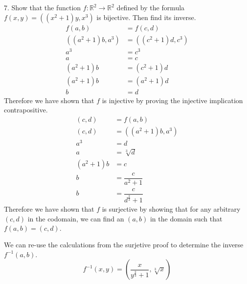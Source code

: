 \documentclass{hippoidC}
\begin{document}
\begin{prooflist}{7. Show that the function $f: \mathbb{R}^2 \rightarrow
			\mathbb{R}^2$ defined by the formula $f(x, y)=\left(\left(x^2+1\right) y,
			x^3\right)$ is bijective. Then find its inverse.}
	\inj{}
	\begin{align*}
		f(a, b)                               & =f(c, d)                                \\
		\left(\left(a^2+1\right)b, a^3\right) & = \left(\left(c^2+1\right)d, c^3\right) \\
		a^3                                   & =c^3                                    \\
		a                                     & =c                                      \\
		(a^2+1)b                              & = (c^2+1)d                              \\
		(a^2+1)b                              & = (a^2+1)d                              \\
		b                                     & = d
	\end{align*}
	Therefore we have shown that $f$ is injective by proving the injective
	implication contrapositive.
	\surj{}
	\begin{align*}
		(c, d)   & = f(a, b)                               \\
		(c, d)   & = \left(\left(a^2+1\right)b, a^3\right) \\
		a^3      & =d                                      \\
		a        & =\sqrt[3]{d}                            \\
		(a^2+1)b & =c                                      \\
		b        & =\dfrac{c}{a^2+1}                       \\
		b        & =\dfrac{c}{d^{\frac{2}{3}}+1}
	\end{align*}
	Therefore we have shown that $f$ is surjective by showing that for any arbitrary
	$(c, d)$ in the codomain, we can find an $(a, b)$ in the domain such that $f(a,
		b)=(c, d)$.
	\item We can re-use the calculations from the surjetive proof to determine the inverse
	$f^{-1}(a, b)$.
	\[f^{-1}(x, y) = \left(\dfrac{x}{y^{\frac{2}{3}}+1}, \sqrt[3]{x}\right)
	\]
\end{prooflist}
\end{document}
